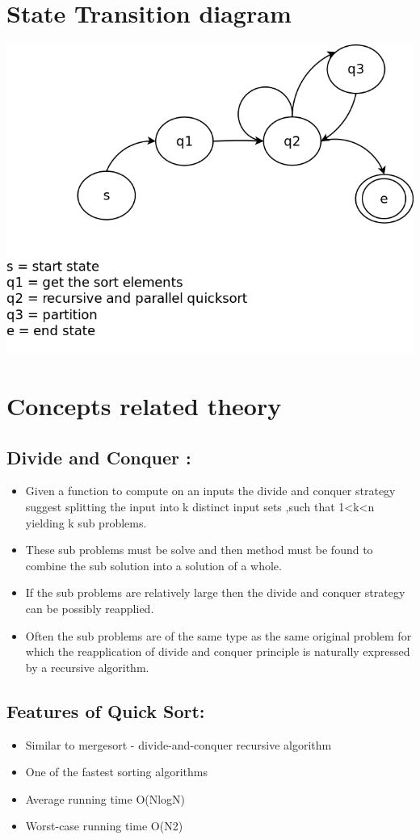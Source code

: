 \documentclass[10pt,a4paper]{article}
\begin{document}
\section{State Transition diagram}
\includegraphics[scale=0.30]{stdg.png}

\section{Concepts related theory}
\subsection{Divide and Conquer : }
	\begin{itemize}
		\item Given a function to compute on an inputs the divide and conquer strategy suggest splitting the input into k distinct input sets ,such that 1<k<n yielding k sub problems.
		\item These sub problems must be solve and then method must be found to combine the sub solution into a solution of a whole.
		\item If the sub problems are relatively large then the divide and conquer strategy can be possibly reapplied.
		\item Often the sub problems are of the same type as the same original problem for which the reapplication of divide and conquer principle is naturally expressed by a recursive algorithm.
	\end{itemize}
	
	\subsection{Features of Quick Sort:}
	\begin{itemize}
		\item Similar to mergesort - divide-and-conquer recursive algorithm 
		\item One of the fastest sorting algorithms 
		\item Average running time O(NlogN) 
		\item Worst-case running time O(N2)
	\end{itemize}
	
\end{document}
